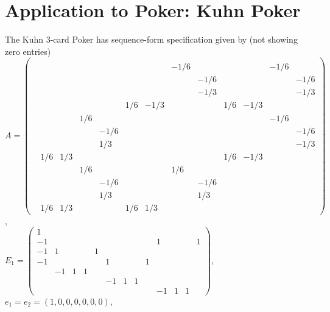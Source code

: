 \documentclass{article} %
\begin{document}
\section{Application to Poker: Kuhn Poker}
The Kuhn 3-card Poker has sequence-form specification given by (not showing zero entries)\\
$A = \left(\begin{array}{ccccccccccccc}
  &   &   &   &   &   &   &   &   &   &   &   &  \\
  &   &   &   &   &   &   & -1 / 6 &   &   &   & -1 / 6 &  \\
  &   &   &   &   &   &   &   & -1 / 6 &   &   &   & -1 / 6\\
  &   &   &   &   &   &   &   & -1 / 3 &   &   &   & -1 / 3\\
  &   &   &   &   & 1 / 6 & -1 / 3 &   &   & 1 / 6 & -1 / 3 &   &  \\
  &   &   & 1 / 6 &   &   &   &   &   &   &   & -1 / 6 &  \\
  &   &   &   & -1 / 6 &   &   &   &   &   &   &   & -1 / 6\\
  &   &   &   & 1 / 3 &   &   &   &   &   &   &   & -1 / 3\\
  & 1 / 6 & 1 / 3 &   &   &   &   &   &   & 1 / 6 & -1 / 3 &   &  \\
  &   &   & 1 / 6 &   &   &   & 1 / 6 &   &   &   &   &  \\
  &   &   &   & -1 / 6 &   &   &   & -1 / 6 &   &   &   &  \\
  &   &   &   & 1 / 3 &   &   &   & 1 / 3 &   &   &   &  \\
  & 1 / 6 & 1 / 3 &   &   & 1 / 6 & 1 / 3 &   &   &   &   &   &  
\end{array}\right)$,\\
$E_1 = \left(\begin{array}{ccccccccccccc}
1 &   &   &   &   &   &   &   &   &   &   &   &  \\
-1 &   &   &   &   &   &   &   &   & 1 &   &   & 1\\
-1 & 1 &   &   & 1 &   &   &   &   &   &   &   &  \\
-1 &   &   &   &   & 1 &   &   & 1 &   &   &   &  \\
  & -1 & 1 & 1 &   &   &   &   &   &   &   &   &  \\
  &   &   &   &   & -1 & 1 & 1 &   &   &   &   &  \\
  &   &   &   &   &   &   &   &   & -1 & 1 & 1 &  
\end{array}\right)$, $e_1 = e_2 = (1, 0, 0, 0, 0, 0, 0)$,\\
\end{document}
